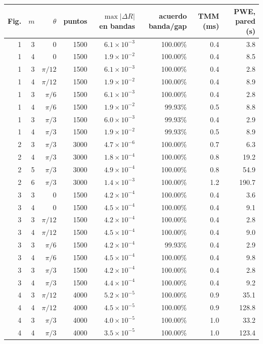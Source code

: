 \begin{tabular}{rrrrrrrr}
\toprule
Fig. & $m$ & $\theta$ & puntos & $\max|\Delta R|$ en bandas & acuerdo banda/gap & TMM (ms) & PWE, pared (s) \\
\midrule
1 & 3 & $0$ & 1500 & $6.1\times10^{-3}$ & 100.00\% & 0.4 & 3.8 \\
1 & 4 & $0$ & 1500 & $1.9\times10^{-2}$ & 100.00\% & 0.4 & 8.5 \\
1 & 3 & $\pi/12$ & 1500 & $6.1\times10^{-3}$ & 100.00\% & 0.4 & 2.8 \\
1 & 4 & $\pi/12$ & 1500 & $1.9\times10^{-2}$ & 100.00\% & 0.4 & 8.9 \\
1 & 3 & $\pi/6$ & 1500 & $6.1\times10^{-3}$ & 100.00\% & 0.4 & 2.8 \\
1 & 4 & $\pi/6$ & 1500 & $1.9\times10^{-2}$ & 99.93\% & 0.5 & 8.8 \\
1 & 3 & $\pi/3$ & 1500 & $6.0\times10^{-3}$ & 99.93\% & 0.4 & 2.9 \\
1 & 4 & $\pi/3$ & 1500 & $1.9\times10^{-2}$ & 99.93\% & 0.5 & 8.9 \\
2 & 3 & $\pi/3$ & 3000 & $4.7\times10^{-6}$ & 100.00\% & 0.7 & 6.3 \\
2 & 4 & $\pi/3$ & 3000 & $1.8\times10^{-4}$ & 100.00\% & 0.8 & 19.2 \\
2 & 5 & $\pi/3$ & 3000 & $4.9\times10^{-4}$ & 100.00\% & 0.8 & 54.9 \\
2 & 6 & $\pi/3$ & 3000 & $1.4\times10^{-3}$ & 100.00\% & 1.2 & 190.7 \\
3 & 3 & $0$ & 1500 & $4.2\times10^{-4}$ & 100.00\% & 0.4 & 3.6 \\
3 & 4 & $0$ & 1500 & $4.5\times10^{-4}$ & 100.00\% & 0.4 & 9.1 \\
3 & 3 & $\pi/12$ & 1500 & $4.2\times10^{-4}$ & 100.00\% & 0.4 & 2.8 \\
3 & 4 & $\pi/12$ & 1500 & $4.5\times10^{-4}$ & 100.00\% & 0.4 & 9.0 \\
3 & 3 & $\pi/6$ & 1500 & $4.2\times10^{-4}$ & 99.93\% & 0.4 & 2.9 \\
3 & 4 & $\pi/6$ & 1500 & $4.5\times10^{-4}$ & 100.00\% & 0.4 & 9.8 \\
3 & 3 & $\pi/3$ & 1500 & $4.2\times10^{-4}$ & 100.00\% & 0.4 & 2.8 \\
3 & 4 & $\pi/3$ & 1500 & $4.4\times10^{-4}$ & 100.00\% & 0.4 & 9.2 \\
4 & 3 & $\pi/12$ & 4000 & $5.2\times10^{-5}$ & 100.00\% & 0.9 & 35.1 \\
4 & 4 & $\pi/12$ & 4000 & $4.5\times10^{-5}$ & 100.00\% & 0.9 & 128.8 \\
4 & 3 & $\pi/3$ & 4000 & $4.0\times10^{-5}$ & 100.00\% & 1.0 & 33.2 \\
4 & 4 & $\pi/3$ & 4000 & $3.5\times10^{-5}$ & 100.00\% & 1.0 & 123.4 \\
\bottomrule
\end{tabular}
